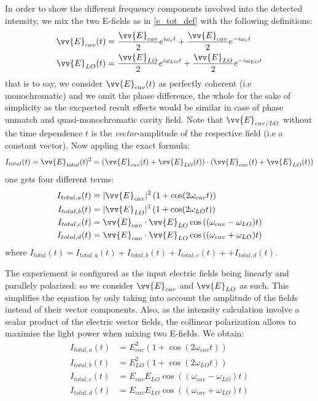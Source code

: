 \documentclass[11pt]{report}
\begin{document}
In order to show the different frequency components involved into the detected intensity, we mix the two E-fields as in \eqref{e_tot_def} with the following definitions:
\begin{align}
\label{e_cav_e_lo}
\begin{split}
\vv{E}_{cav}(t) &=\frac{\vv{E}_{cav}}{2} e^{i\omega_{c}t} + \frac{\vv{E}_{cav}}{2} e^{-i\omega_{c}t} \\
\vv{E}_{LO}(t) &= \frac{\vv{E}_{LO}}{2} e^{i\omega_{LO}t} + \frac{\vv{E}_{LO}}{2} e^{-i\omega_{LO}t}
\end{split}
\end{align}that is to say, we consider $\vv{E}_{cav}(t)$ as perfectly coherent (i.e monochromatic) and we omit the phase difference, the whole for the sake of simplicity as the excpected result effects would be similar in case of phase unmatch and quasi-monochromatic cavity field. Note that $\vv{E}_{cav/LO}$ without the time dependence $t$ is the \textit{vector}-amplitude of the respective field (i.e a constant vector). Now appling the exact formula:
\begin{equation}
I_{total}(t) = \vv{E}_{total}(t)^2 = \left(\vv{E}_{cav}(t) + \vv{E}_{LO}(t)\right) \cdot \left(\vv{E}_{cav}(t) + \vv{E}_{LO}(t)\right)
\end{equation} 
one gets four different terms:
\begin{align}
I_{total,a}(t) &= \vert\vv{E}_{cav}\vert^2\left(1 + \cos(2\omega_{cav}t)\right)\\
I_{total,b}(t) &= \vert\vv{E}_{LO}\vert^2\left(1 + \cos(2\omega_{LO}t)\right)\\
I_{total,c}(t) &= \vv{E}_{cav}\cdot\vv{E}_{LO}\cos\left((\omega_{cav} - \omega_{LO})t\right)\\
I_{total,d}(t) &= \vv{E}_{cav}\cdot\vv{E}_{LO}\cos\left((\omega_{cav} + \omega_{LO})t\right)
\end{align}
where $I_{total}(t) = I_{total,a}(t) + I_{total,b}(t) + I_{total,c}(t) + + I_{total,d}(t)$.

The experiement is configured as the input electric fields being linearly and parallely polarized: so we consider $\vv{E}_{cav}$ and $\vv{E}_{LO}$ as such. This simplifies the equation by only taking into account the amplitude of the fields instead of their vector components. Also, as the intensity calculation involve a scalar product of the electric vector fields, the collinear polarization allows to maximise the light power when mixing two E-fields. We obtain:
\begin{align}
I_{total,a}(t) &= E_{cav}^2\left(1 + \cos(2\omega_{cav}t)\right)\\
I_{total,b}(t) &= E_{LO}^2\left(1 + \cos(2\omega_{LO}t)\right)\\
\label{mix_hetero_ic}
I_{total,c}(t) &= E_{cav}E_{LO}\cos\left((\omega_{cav} - \omega_{LO})t\right)\\
\label{mix_hetero_id}
I_{total,d}(t) &= E_{cav}E_{LO}\cos\left((\omega_{cav} + \omega_{LO})t\right)
\end{align}
\end{document}
